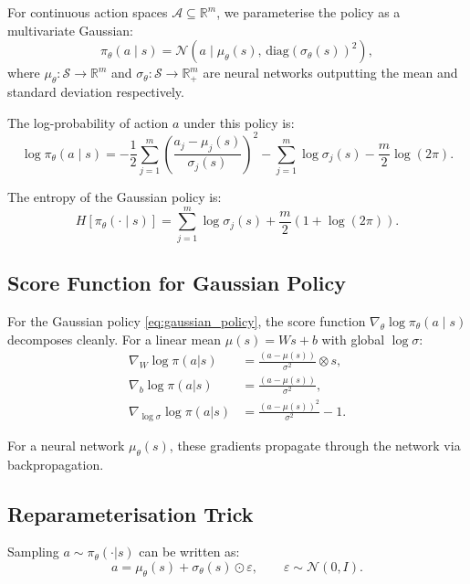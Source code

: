 \documentclass[11pt, a4paper]{article}
\newcommand{\R}{\mathbb{R}}
\newcommand{\N}{\mathcal{N}}
\newcommand{\diag}{\mathrm{diag}}
\newcommand{\grad}{\nabla}
\begin{document}
For continuous action spaces $\mathcal{A} \subseteq \R^m$, we parameterise
the policy as a multivariate Gaussian:
\begin{equation}
    \pi_\theta(a \mid s) = \N\left(a \;\Big|\; \mu_\theta(s), \, \diag(\sigma_\theta(s))^2\right),
    \label{eq:gaussian_policy}
\end{equation}
where $\mu_\theta : \mathcal{S} \to \R^m$ and $\sigma_\theta : \mathcal{S} \to \R_+^m$
are neural networks outputting the mean and standard deviation respectively.

The log-probability of action $a$ under this policy is:
\begin{equation}
    \log \pi_\theta(a \mid s)
    = -\frac{1}{2} \sum_{j=1}^{m} \left(\frac{a_j - \mu_j(s)}{\sigma_j(s)}\right)^2
    - \sum_{j=1}^{m} \log \sigma_j(s)
    - \frac{m}{2} \log(2\pi).
    \label{eq:log_prob}
\end{equation}

The entropy of the Gaussian policy is:
\begin{equation}
    H[\pi_\theta(\cdot \mid s)] = \sum_{j=1}^{m} \log \sigma_j(s) + \frac{m}{2}(1 + \log(2\pi)).
\end{equation}

\subsection{Score Function for Gaussian Policy}

For the Gaussian policy \eqref{eq:gaussian_policy}, the score function
$\grad_\theta \log \pi_\theta(a \mid s)$ decomposes cleanly.
For a linear mean $\mu(s) = Ws + b$ with global $\log\sigma$:
\begin{align}
    \grad_W \log \pi(a|s) &= \frac{(a - \mu(s))}{\sigma^2} \otimes s, \\
    \grad_b \log \pi(a|s) &= \frac{(a - \mu(s))}{\sigma^2}, \\
    \grad_{\log\sigma} \log \pi(a|s) &= \frac{(a - \mu(s))^2}{\sigma^2} - 1.
\end{align}

For a neural network $\mu_\theta(s)$, these gradients propagate through the
network via backpropagation.

\subsection{Reparameterisation Trick}

Sampling $a \sim \pi_\theta(\cdot|s)$ can be written as:
\begin{equation}
    a = \mu_\theta(s) + \sigma_\theta(s) \odot \varepsilon, \qquad
    \varepsilon \sim \N(0, I).
\end{equation}
\end{document}
